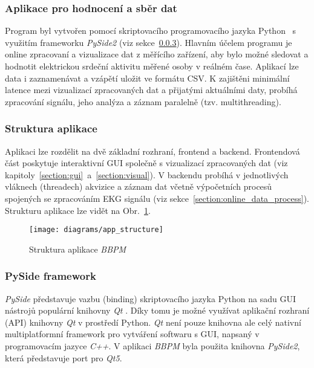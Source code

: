 \subsubsection{Aplikace pro hodnocení a sběr dat}
Program byl vytvořen pomocí skriptovacího programovacího jazyka
Python~\cite{python} s využitím frameworku \textit{PySide2} (viz
sekce~\ref{section:pyside}). Hlavním účelem programu je online zpracovaní a
vizualizace dat z měřícího zařízení, aby bylo možné sledovat a hodnotit
elektrickou srdeční aktivitu měřené osoby v reálném čase. Aplikací lze data i
zaznamenávat a vzápětí uložit ve formátu CSV. K zajištěni minimální latence mezi
vizualizací zpracovaných dat a přijatými aktuálními daty, probíhá zpracování
signálu, jeho analýza a záznam paralelně (tzv. multithreading).

\subsubsection{Struktura aplikace}
Aplikaci lze rozdělit na dvě základní rozhraní, frontend a backend. Frontendová
část poskytuje interaktivní GUI společně s vizualizací zpracovaných dat (viz
kapitoly~\ref{section:gui}~a~\ref{section:visual}). V backendu probíhá v
jednotlivých vláknech (threadech) akvizice a záznam dat včetně výpočetních
procesů spojených se zpracováním EKG signálu (viz
sekce~\ref{section:online_data_process}). Strukturu aplikace lze vidět na
Obr.~\ref{fig:app_structure}.

\begin{figure}[h]
    \begin{center}
        \texttt{[image: diagrams/app\_structure]}
        \caption{Struktura aplikace \textit{BBPM}}
        \label{fig:app_structure}
    \end{center}
\end{figure}

\subsubsection{PySide framework}
\label{section:pyside}
\textit{PySide} představuje vazbu (binding) skriptovacího jazyka Python
na sadu GUI nástrojů populární knihovny \textit{Qt} \cite{Qt}. Díky tomu je
možné využívat aplikační rozhraní (API) knihovny \textit{Qt} v prostředí
Python. \textit{Qt} není pouze knihovna ale celý nativní
multiplatformní framework pro vytváření softwaru s GUI, napsaný v programovacím
jazyce \textit{C++}. V aplikaci \textit{BBPM} byla použita knihovna
\textit{PySide2}, která představuje port pro \textit{Qt5}.

